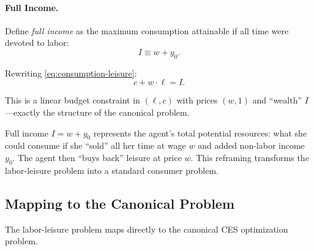 \paragraph{Full Income.}
Define \emph{full income} as the maximum consumption attainable if all time were devoted to labor:
\begin{equation}
I \equiv w + y_0.
\label{eq:full-income}
\end{equation}

Rewriting \eqref{eq:consumption-leisure}:
\begin{equation}
\boxed{c + w \cdot \ell = I.}
\label{eq:full-income-budget}
\end{equation}

This is a linear budget constraint in $(\ell, c)$ with prices $(w, 1)$ and ``wealth'' $I$---exactly the structure of the canonical problem.

\begin{calloutnote}
Full income $I = w + y_0$ represents the agent's total potential resources: what she could consume if she ``sold'' all her time at wage $w$ and added non-labor income $y_0$. The agent then ``buys back'' leisure at price $w$. This reframing transforms the labor-leisure problem into a standard consumer problem.
\end{calloutnote}

\subsection{Mapping to the Canonical Problem}
\label{subsec:labor-canonical}

The labor-leisure problem maps directly to the canonical CES optimization problem.

